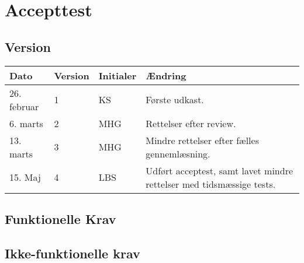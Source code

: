 \chapter{Accepttest} \label{ch:Accepttest}
\section*{Version}
\begin{table}[h]
	\centering
	\begin{tabularx}{\textwidth - 2cm}{|l|l|l|X|}
	\hline
	Dato			& Version			& Initialer 		& Ændring					\\ \hline
	26. februar 	& 1 				& KS 				& Første udkast. 			\\ \hline
	6. marts 		& 2 				& MHG 				& Rettelser efter review. 	\\ \hline
	13. marts & 3 & MHG & Mindre rettelser efter fælles gennemlæsning.\\\hline
	15. Maj & 4 & LBS & Udført acceptest, samt lavet mindre rettelser med tidsmæssige tests. \\\hline
	\end{tabularx}
\end{table}
\clearpage

\section{Funktionelle Krav}
\clearpage
{} 
\clearpage
{}
\clearpage
{} 
\clearpage
{}
\clearpage
{}
\clearpage
{}

\clearpage

\section{Ikke-funktionelle krav}

\clearpage